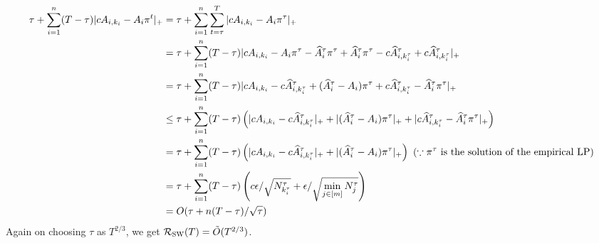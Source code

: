 \begin{align*}
    \tau + \sum_{i=1}^n(T-\tau)|cA_{i, k_i}-A_i\pi^t|_+ &= \tau + \sum_{i=1}^n\sum_{t=\tau}^T|cA_{i, k_i}-A_i\pi^\tau|_+ \\
    & = \tau + \sum_{i=1}^n (T-\tau)|cA_{i,k_i}-A_i\pi^\tau - \widehat{A}_i^\tau \pi^\tau + \widehat{A}_i^\tau \pi^\tau - c\widehat{A}^\tau_{i, k_i^\tau}+c\widehat{A}^\tau_{i, k_i^\tau}|_+\\
    &= \tau + \sum_{i=1}^n (T-\tau)|cA_{i,k_i}- c\widehat{A}^\tau_{i, k_i^\tau}  + (\widehat{A}_i^\tau -A_i)\pi^\tau +c\widehat{A}^\tau_{i, k_i^\tau}- \widehat{A}_i^\tau \pi^\tau|_+\\
    &\leq \tau + \sum_{i=1}^n (T-\tau)\left(|cA_{i,k_i}- c\widehat{A}^\tau_{i, k_i^\tau}|_+  + |(\widehat{A}_i^\tau -A_i)\pi^\tau|_+ +|c\widehat{A}^\tau_{i, k_i^\tau}- \widehat{A}_i^\tau \pi^\tau|_+\right)\\
    & = \tau + \sum_{i=1}^n (T-\tau)\left(|cA_{i,k_i}- c\widehat{A}^\tau_{i, k_i^\tau}|_+  + |(\widehat{A}_i^\tau -A_i)\pi^\tau|_+\right) \ (\because \pi^\tau \textup{ is the solution of the empirical LP})\\
    & = \tau + \sum_{i=1}^n (T-\tau)\left(c\epsilon/\sqrt{N_{k_i^\tau}^\tau} + \epsilon/\sqrt{\min_{j\in [m]}N_j^\tau}\right)\\
    & = O(\tau + n(T-\tau)/\sqrt{\tau})
\end{align*}
Again on choosing $\tau$ as $T^{2/3}$, we get $\mathcal{R}_\textsc{SW}(T)=\tilde{O}(T^{2/3})$.

\fi